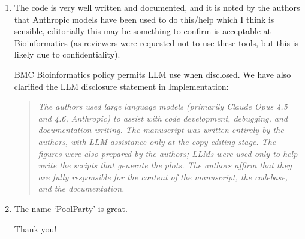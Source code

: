 \documentclass[11pt]{article}
\newenvironment{response}{\par\color{responseblue}}{\par}
\newenvironment{msquote}
  {\begin{quote}\color{responseblue}\itshape\noindent\ignorespaces}
  {\end{quote}}
\begin{document}
\begin{enumerate}
\begin{msquote}
For example, in the SpliceAI analysis of Fig.~\ref{ms-fig:figure4}, the cryptic splice-site strength and position recorded in each design card provided the covariates used for surrogate modeling.
\end{msquote}

\item The code is very well written and documented, and it is noted by the
authors that Anthropic models have been used to do this/help which I think is
sensible, editorially this may be something to confirm is acceptable at
Bioinformatics (as reviewers were requested not to use these tools, but this is
likely due to confidentiality).

\begin{response}
BMC Bioinformatics policy permits LLM use when disclosed. We have also clarified the LLM disclosure statement in Implementation:
\end{response}

\begin{msquote}
The authors used large language models (primarily Claude Opus 4.5 and 4.6, Anthropic) to assist with code development, debugging, and documentation writing. The manuscript was written entirely by the authors, with LLM assistance only at the copy-editing stage. The figures were also prepared by the authors; LLMs were used only to help write the scripts that generate the plots. The authors affirm that they are fully responsible for the content of the manuscript, the codebase, and the documentation. 
\end{msquote}

\item The name `PoolParty' is great.

\begin{response}
Thank you!
\end{response}
\end{enumerate}



\end{document}
